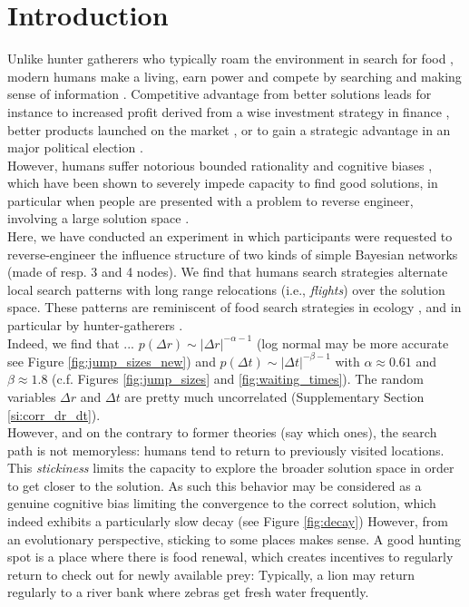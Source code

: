 \section{Introduction}
Unlike hunter gatherers who typically  roam the environment in search for food \cite{}, modern humans make a living, earn power and compete by searching and making sense of information \cite{}. Competitive advantage from better solutions leads for instance to increased profit derived from a wise investment strategy in finance \cite{}, better products launched on the market \cite{}, or to gain a strategic advantage in an major political election \cite{obama_ict}. \\

However, humans suffer notorious bounded rationality \cite{simon} and cognitive biases \cite{}, which have been shown to severely impede capacity to find good solutions, in particular when people are presented with a problem  to reverse engineer, involving a large solution space \cite{}.\\

Here, we have conducted an experiment in which participants were requested to reverse-engineer the influence structure of two kinds of simple Bayesian networks (made of resp. 3 and 4 nodes). We find that humans search strategies alternate local search patterns with long range relocations (i.e., {\it flights}) over the solution space. These patterns are reminiscent of food search strategies in ecology \cite{}, and in particular by hunter-gatherers \cite{}.\\ 

Indeed, we find that ...  $p(\Delta r) \sim |\Delta r | ^{-\alpha -1}$ (log normal may be more accurate see Figure \ref{fig:jump_sizes_new}) and $p(\Delta t) \sim  |\Delta t | ^{-\beta -1}$ with $\alpha \approx 0.61$ and $\beta \approx 1.8$ (c.f. Figures \ref{fig:jump_sizes} and \ref{fig:waiting_times}). The random variables $\Delta r$ and $\Delta t$ are pretty much uncorrelated (Supplementary Section \ref{si:corr_dr_dt}).\\

However, and on the contrary to former theories (say which ones), the search path is not memoryless: humans tend to return to previously visited locations. This {\it stickiness} limits the capacity to explore the broader solution space in order to get closer to the solution. As such this behavior may be considered as a genuine cognitive bias limiting the convergence to the correct solution, which indeed exhibits a particularly slow decay (see Figure \ref{fig:decay})  However, from an evolutionary perspective, sticking to some places makes sense. A good hunting spot is a place where there is food renewal, which creates incentives to regularly return to check out for newly available prey: Typically, a lion may return regularly to a river bank where zebras get fresh water frequently. \\

